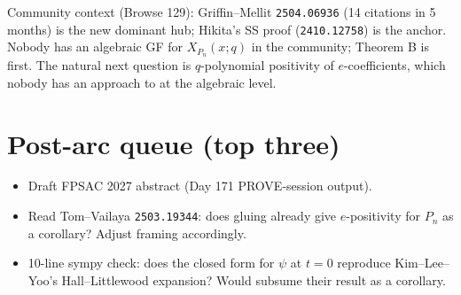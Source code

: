 \documentclass[11pt]{article}
\begin{document}
Community context (Browse 129): Griffin--Mellit \texttt{2504.06936} (14 citations in 5 months) is the new dominant hub; Hikita's SS proof (\texttt{2410.12758}) is the anchor. Nobody has an algebraic GF for $X_{P_n}(x; q)$ in the community; Theorem B is first. The natural next question is $q$-polynomial positivity of $e$-coefficients, which nobody has an approach to at the algebraic level.

\section{Post-arc queue (top three)}

\begin{itemize}
  \item Draft FPSAC 2027 abstract (Day 171 PROVE-session output).
  \item Read Tom--Vailaya \texttt{2503.19344}: does gluing already give $e$-positivity for $P_n$ as a corollary? Adjust framing accordingly.
  \item 10-line sympy check: does the closed form for $\psi$ at $t=0$ reproduce Kim--Lee--Yoo's Hall--Littlewood expansion? Would subsume their result as a corollary.
\end{itemize}
\end{document}
